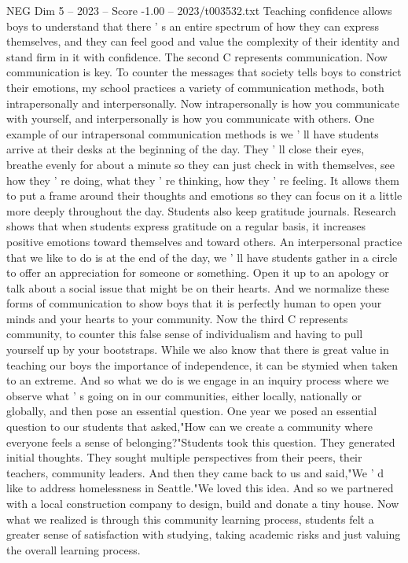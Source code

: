 \begin{textsample}{NEG Dim 5 – 2023 – Score -1.00 – 2023/t003532.txt}
Teaching confidence allows boys to understand that there ' s an entire spectrum of how they can express themselves, and they can feel good and value the complexity of their identity and stand firm in it with confidence.
The second C represents communication.
Now communication is key.
To counter the messages that society tells boys to constrict their emotions, my school practices a variety of communication methods, both intrapersonally and interpersonally.
Now intrapersonally is how you communicate with yourself, and interpersonally is how you communicate with others.
One example of our intrapersonal communication methods is we ' ll have students arrive at their desks at the beginning of the day.
They ' ll close their eyes, breathe evenly for about a minute so they can just check in with themselves, see how they ' re doing, what they ' re thinking, how they ' re feeling.
It allows them to put a frame around their thoughts and emotions so they can focus on it a little more deeply throughout the day.
Students also keep gratitude journals.
Research shows that when students express gratitude on a regular basis, it increases positive emotions toward themselves and toward others.
An interpersonal practice that we like to do is at the end of the day, we ' ll have students gather in a circle to offer an appreciation for someone or something.
Open it up to an apology or talk about a social issue that might be on their hearts.
And we normalize these forms of communication to show boys that it is perfectly human to open your minds and your hearts to your community.
Now the third C represents community, to counter this false sense of individualism and having to pull yourself up by your bootstraps.
While we also know that there is great value in teaching our boys the importance of independence, it can be stymied when taken to an extreme.
And so what we do is we engage in an inquiry process where we observe what ' s going on in our communities, either locally, nationally or globally, and then pose an essential question.
One year we posed an essential question to our students that asked,"How can we create a community where everyone feels a sense of belonging?"Students took this question.
They generated initial thoughts.
They sought multiple perspectives from their peers, their teachers, community leaders.
And then they came back to us and said,"We ' d like to address homelessness in Seattle."We loved this idea.
And so we partnered with a local construction company to design, build and donate a tiny house.
Now what we realized is through this community learning process, students felt a greater sense of satisfaction with studying, taking academic risks and just valuing the overall learning process.

\end{textsample}
